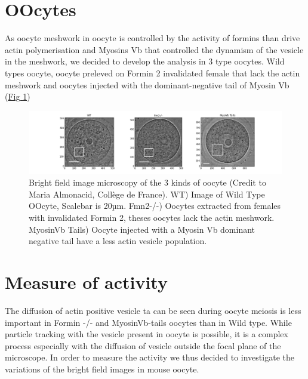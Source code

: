 \documentclass[A4paperpaper,11pt,english]{sphinxmanual}
\begin{document}
\section{OOcytes}
\label{parts/part5:oocytes}
As oocyte meshwork in oocyte is controlled by the activity of formins than
drive actin polymerisation and Myosins Vb that controlled the dynamism of the
vesicle in the meshwork, we decided to develop the analysis in 3 type oocytes.
Wild types oocyte, oocyte preleved on Formin 2 invalidated female that lack the
actin meshwork and oocytes injected  with the dominant-negative tail of Myosin
Vb (\hyperref[parts/part5:fig3oo]{Fig  \ref*{parts/part5:fig3oo}})
\begin{figure}[htbp]
\centering
\capstart

\includegraphics[width=1.000\linewidth]{3-oocytes.png}
\caption{Bright field image microscopy of the 3 kinds of oocyte (Credit to Maria
Almonacid, Collège de France). WT) Image of Wild Type OOcyte, Scalebar is
20µm. Fmn2-/-) Oocytes extracted from females with invalidated Formin 2,
theses oocytes lack the actin meshwork. MyosinVb Tails) Oocyte injected
with a Myosin Vb dominant negative tail have a less actin vesicle
population.}\label{parts/part5:fig3oo}\end{figure}


\section{Measure of activity}
\label{parts/part5:measure-of-activity}
The diffusion of actin positive vesicle ta can be seen during oocyte meiosis is
less important in Formin -/- and MyosinVb-tails oocytes than in Wild type.
While particle tracking with the vesicle present in oocyte is possible, it is a
complex process especially with the diffusion of vesicle outside the focal
plane of the microscope. In order to measure the activity we thus decided to
investigate the variations of the bright field images in mouse oocyte.
\end{document}
